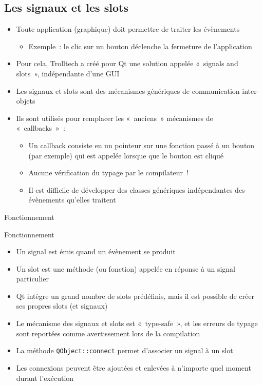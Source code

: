 \documentclass{beamer} %
\begin{document}
\subsection{Les signaux et les slots}

\begin{frame}
	\begin{itemize}
	\item Toute application (graphique) doit permettre de traiter les évènements
		\begin{itemize}
		\item<2-> Exemple~: le clic sur un bouton déclenche la fermeture de l'application
		\end{itemize}
	\item<3-> Pour cela, Trolltech a créé pour Qt une solution appelée «~signals and slots~», \color{red}indépendante d'une GUI \color{black}
	\item<4-> Les signaux et slots sont des mécanismes génériques de communication inter-objets
	\item<5-> Ils sont utilisés pour remplacer les «~anciens~» mécanismes de «~callbacks~»~:
		\begin{itemize}
		\item<6-> Un callback consiste en un pointeur sur une fonction passé à un bouton (par exemple) qui est appelée lorsque que le bouton est cliqué
		\item<7-> Aucune vérification du typage par le compilateur~!
		\item<8-> Il est difficile de développer des classes génériques indépendantes des évènements qu'elles traitent
		\end{itemize}
	\end{itemize}
\end{frame}

\begin{frame}{Fonctionnement}
	
	\centerline{}
\end{frame}

\begin{frame}{Fonctionnement}

	\begin{itemize}
	\item Un signal est émis quand un évènement se produit
	\item<2-> Un slot est une méthode (ou fonction) appelée en réponse à un signal particulier
	\item<3-> Qt intègre un grand nombre de slots prédéfinis, mais il est possible de créer ses propres slots (et signaux)
	\item<4-> Le mécanisme des signaux et slots est «~type-safe~», et les erreurs de typage sont reportées comme avertissement lors de la compilation
	\item<5-> La méthode \texttt{QObject::connect} permet d'associer un signal à un slot
	\item<6-> Les connexions peuvent être ajoutées et enlevées à n'importe quel moment durant l'exécution
	\end{itemize}
\end{frame}
\end{document}
